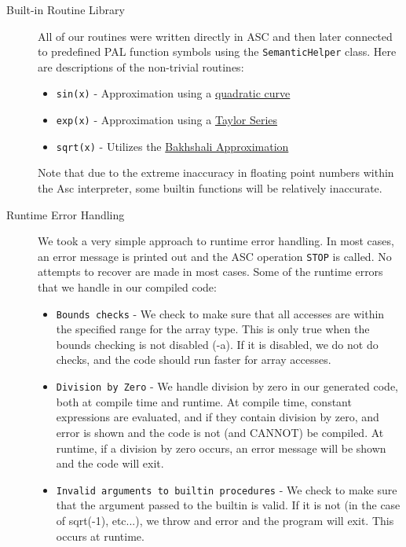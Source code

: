 \documentclass{article}
\begin{document}
\begin{description}
\item[Built-in Routine Library]
	All of our routines were written directly in ASC and then later connected to predefined PAL function symbols using the \texttt{SemanticHelper}
	class. Here are descriptions of the non-trivial routines:
	\begin{itemize}
		\item
			\texttt{sin(x)} - Approximation using a \href{http://lab.polygonal.de/?p=205}{quadratic curve}
		\item
			\texttt{exp(x)} - Approximation using a \href{http://en.wikipedia.org/wiki/Taylor_series#Approximation_and_convergence}{Taylor Series} 
		\item
			\texttt{sqrt(x)} - Utilizes the \href{http://en.wikipedia.org/wiki/Methods_of_computing_square_roots}{Bakhshali Approximation}
	
	\end{itemize}
	Note that due to the extreme inaccuracy in floating point numbers within the Asc interpreter, some builtin functions will be relatively inaccurate. 
	
\item[Runtime Error Handling]
	We took a very simple approach to runtime error handling. In most cases, an error message is printed out and the ASC operation \texttt{STOP} is
	called. No attempts to recover are made in most cases. Some of the runtime errors that we handle in our compiled code:
	\begin{itemize}
		\item
			\texttt{Bounds checks} - We check to make sure that all accesses are within the specified range for the array type. This is only true
				when the bounds checking is not disabled (-a). If it is disabled, we do not do checks, and the code should run faster for array accesses.

		\item
			\texttt{Division by Zero} - We handle division by zero in our generated code, both at compile time and runtime. At compile time, constant expressions
				are evaluated, and if they contain division by zero, and error is shown and the code is not (and CANNOT) be compiled. At runtime, if a division
				by zero occurs, an error message will be shown and the code will exit.

		\item
			\texttt{Invalid arguments to builtin procedures} - We check to make sure that the argument passed to the builtin is valid. If it is not (in the case of sqrt(-1), etc...),
				we throw and error and the program will exit. This occurs at runtime.
	\end{itemize}
	
\end{description}
\end{document}
